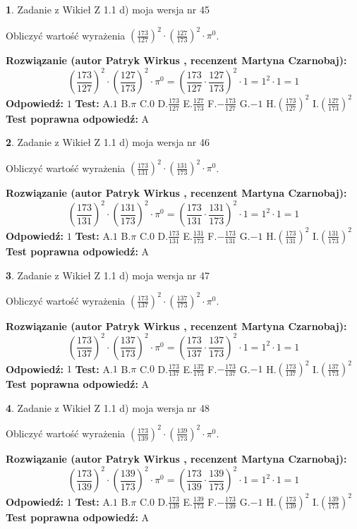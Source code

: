 \documentclass[12pt, a4paper]{article}
\theoremstyle{definition} %
\newtheorem{zad}{}
\newcommand{\zadStart}[1]{\begin{zad}#1\newline}
\newcommand{\zadStop}{\end{zad}}
\newcommand{\rozwStart}[2]{\noindent \textbf{Rozwiązanie (autor #1 , recenzent #2): }\newline}
\newcommand{\rozwStop}{\newline}
\newcommand{\odpStart}{\noindent \textbf{Odpowiedź:}\newline}
\newcommand{\odpStop}{\newline}
\newcommand{\testStart}{\noindent \textbf{Test:}\newline}
\newcommand{\testStop}{\newline}
\newcommand{\kluczStart}{\noindent \textbf{Test poprawna odpowiedź:}\newline}
\newcommand{\kluczStop}{\newline}
\begin{document}
\zadStart{Zadanie z Wikieł Z 1.1 d) moja wersja nr 45}

Obliczyć wartość wyrażenia $(\frac{173}{127})^{2} \cdot (\frac{127}{173})^{2} \cdot \pi^{0}$.
\zadStop
\rozwStart{Patryk Wirkus}{Martyna Czarnobaj}
$$(\frac{173}{127})^{2} \cdot (\frac{127}{173})^{2} \cdot \pi^{0} = (\frac{173}{127} \cdot \frac{127}{173})^{2} \cdot 1 = 1^{2} \cdot 1 = 1$$
\rozwStop
\odpStart
$1$
\odpStop
\testStart
A.$1$ B.$\pi$ C.$0$ D.$\frac{173}{127}$ E.$\frac{127}{173}$
F.$-\frac{173}{127}$ G.$-1$
H.$(\frac{173}{127})^{2}$
I.$(\frac{127}{173})^{2}$
\testStop
\kluczStart
A
\kluczStop



\zadStart{Zadanie z Wikieł Z 1.1 d) moja wersja nr 46}

Obliczyć wartość wyrażenia $(\frac{173}{131})^{2} \cdot (\frac{131}{173})^{2} \cdot \pi^{0}$.
\zadStop
\rozwStart{Patryk Wirkus}{Martyna Czarnobaj}
$$(\frac{173}{131})^{2} \cdot (\frac{131}{173})^{2} \cdot \pi^{0} = (\frac{173}{131} \cdot \frac{131}{173})^{2} \cdot 1 = 1^{2} \cdot 1 = 1$$
\rozwStop
\odpStart
$1$
\odpStop
\testStart
A.$1$ B.$\pi$ C.$0$ D.$\frac{173}{131}$ E.$\frac{131}{173}$
F.$-\frac{173}{131}$ G.$-1$
H.$(\frac{173}{131})^{2}$
I.$(\frac{131}{173})^{2}$
\testStop
\kluczStart
A
\kluczStop



\zadStart{Zadanie z Wikieł Z 1.1 d) moja wersja nr 47}

Obliczyć wartość wyrażenia $(\frac{173}{137})^{2} \cdot (\frac{137}{173})^{2} \cdot \pi^{0}$.
\zadStop
\rozwStart{Patryk Wirkus}{Martyna Czarnobaj}
$$(\frac{173}{137})^{2} \cdot (\frac{137}{173})^{2} \cdot \pi^{0} = (\frac{173}{137} \cdot \frac{137}{173})^{2} \cdot 1 = 1^{2} \cdot 1 = 1$$
\rozwStop
\odpStart
$1$
\odpStop
\testStart
A.$1$ B.$\pi$ C.$0$ D.$\frac{173}{137}$ E.$\frac{137}{173}$
F.$-\frac{173}{137}$ G.$-1$
H.$(\frac{173}{137})^{2}$
I.$(\frac{137}{173})^{2}$
\testStop
\kluczStart
A
\kluczStop



\zadStart{Zadanie z Wikieł Z 1.1 d) moja wersja nr 48}

Obliczyć wartość wyrażenia $(\frac{173}{139})^{2} \cdot (\frac{139}{173})^{2} \cdot \pi^{0}$.
\zadStop
\rozwStart{Patryk Wirkus}{Martyna Czarnobaj}
$$(\frac{173}{139})^{2} \cdot (\frac{139}{173})^{2} \cdot \pi^{0} = (\frac{173}{139} \cdot \frac{139}{173})^{2} \cdot 1 = 1^{2} \cdot 1 = 1$$
\rozwStop
\odpStart
$1$
\odpStop
\testStart
A.$1$ B.$\pi$ C.$0$ D.$\frac{173}{139}$ E.$\frac{139}{173}$
F.$-\frac{173}{139}$ G.$-1$
H.$(\frac{173}{139})^{2}$
I.$(\frac{139}{173})^{2}$
\testStop
\kluczStart
A
\kluczStop
\end{document}
